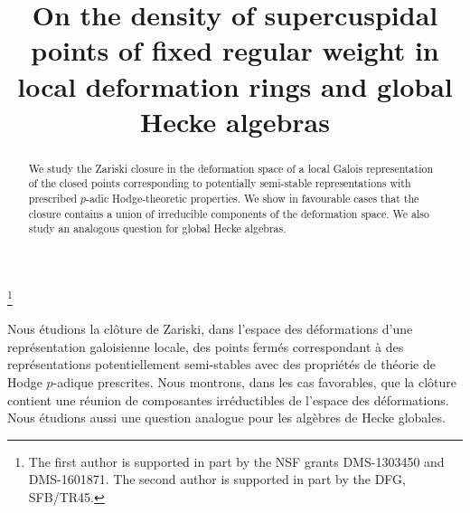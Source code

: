 \documentclass[JEP,XML,SOM,Unicode,NoEqCountersInSection]{cedram}
\theoremstyle{definition}
\begin{document}
\frontmatter
\title[On the density of supercuspidal points]{On the density of supercuspidal points of fixed regular weight in local deformation rings
and global Hecke algebras}

\author[\initial{M.} \lastname{Emerton}]{ }
\address{University of Chicago, Department of Mathematics\\
5734 S. University Ave., Chicago, IL 60637, United States}

\author[\initial{V.} \lastname{Pa\v{s}k\={u}nas}]{ }
\address{Universität Duisburg-Essen, Fakultät für Mathematik\\
Thea-Leymann-Str. 9, 45127 Essen, Germany}

\thanks{The first author is supported in part by the
NSF grants DMS-1303450 and DMS-1601871. The second author is supported in part by the DFG, SFB/TR45.}



\begin{abstract}
We study the Zariski closure in the deformation space of a local Galois representation of the closed points corresponding to potentially semi-stable representations with prescribed $p$-adic Hodge-theoretic properties. We show in favourable cases that the closure contains a union of irreducible components of the deformation space. We also study an analogous question for global Hecke algebras.
\end{abstract}



\begin{altabstract}
Nous étudions la clôture de Zariski, dans l'espace des déformations d'une représentation galoisienne locale, des points fermés correspondant à des représentations potentiellement semi-stables avec des propriétés de théorie de Hodge $p$-adique prescrites. Nous montrons, dans les cas favorables, que la clôture contient une réunion de composantes irréductibles de l'espace des déformations. Nous étudions aussi une question analogue pour les algèbres de Hecke globales.
\end{altabstract}
\maketitle
\vspace*{-5pt}
\tableofcontents
\mainmatter
\end{document}
